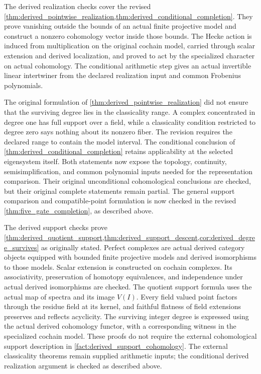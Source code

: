 \documentclass[11pt]{amsart}
\theoremstyle{definition}
\theoremstyle{remark}
\begin{document}
The derived realization checks cover the revised \cref{thm:derived_pointwise_realization,thm:derived_conditional_completion}. They prove vanishing outside the bounds of an actual finite projective model and construct a nonzero cohomology vector inside those bounds. The Hecke action is induced from multiplication on the original cochain model, carried through scalar extension and derived localization, and proved to act by the specialized character on actual cohomology. The conditional arithmetic step gives an actual invertible linear intertwiner from the declared realization input and common Frobenius polynomials.

The original formulation of \cref{thm:derived_pointwise_realization} did not ensure that the surviving degree lies in the classicality range. A complex concentrated in degree one has full support over a field, while a classicality condition restricted to degree zero says nothing about its nonzero fiber. The revision requires the declared range to contain the model interval. The conditional conclusion of \cref{thm:derived_conditional_completion} retains applicability at the selected eigensystem itself. Both statements now expose the topology, continuity, semisimplification, and common polynomial inputs needed for the representation comparison. Their original unconditional cohomological conclusions are checked, but their original complete statements remain partial. The general support comparison and compatible-point formulation is now checked in the revised \cref{thm:five_gate_completion}, as described above.

The derived support checks prove \cref{thm:derived_quotient_support,thm:derived_support_descent,cor:derived_degree_survives} as originally stated. Perfect complexes are actual derived category objects equipped with bounded finite projective models and derived isomorphisms to those models. Scalar extension is constructed on cochain complexes. Its associativity, preservation of homotopy equivalences, and independence under actual derived isomorphisms are checked. The quotient support formula uses the actual map of spectra and its image \(V(I)\). Every field valued point factors through the residue field at its kernel, and faithful flatness of field extensions preserves and reflects acyclicity. The surviving integer degree is expressed using the actual derived cohomology functor, with a corresponding witness in the specialized cochain model. These proofs do not require the external cohomological support description in \cref{fact:derived_support_cohomology}. The external classicality theorems remain supplied arithmetic inputs; the conditional derived realization argument is checked as described above.
\end{document}
